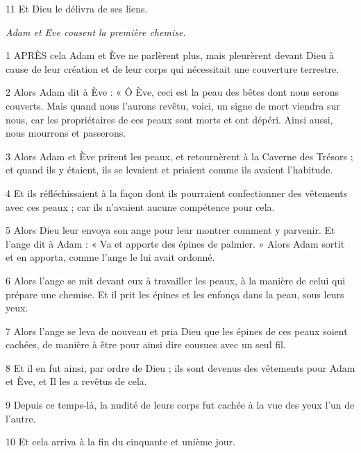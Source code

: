 \par 11 Et Dieu le délivra de ses liens.


\par \textit{Adam et Eve cousent la première chemise.}

\par 1 APRÈS cela Adam et Ève ne parlèrent plus, mais pleurèrent devant Dieu à cause de leur création et de leur corps qui nécessitait une couverture terrestre.

\par 2 Alors Adam dit à Ève : « Ô Ève, ceci est la peau des bêtes dont nous serons couverts. Mais quand nous l'aurons revêtu, voici, un signe de mort viendra sur nous, car les propriétaires de ces peaux sont morts et ont dépéri. Ainsi aussi, nous mourrons et passerons.

\par 3 Alors Adam et Ève prirent les peaux, et retournèrent à la Caverne des Trésors ; et quand ils y étaient, ils se levaient et priaient comme ils avaient l'habitude.

\par 4 Et ils réfléchissaient à la façon dont ils pourraient confectionner des vêtements avec ces peaux ; car ils n’avaient aucune compétence pour cela.

\par 5 Alors Dieu leur envoya son ange pour leur montrer comment y parvenir. Et l'ange dit à Adam : « Va et apporte des épines de palmier. » Alors Adam sortit et en apporta, comme l'ange le lui avait ordonné.

\par 6 Alors l'ange se mit devant eux à travailler les peaux, à la manière de celui qui prépare une chemise. Et il prit les épines et les enfonça dans la peau, sous leurs yeux.

\par 7 Alors l'ange se leva de nouveau et pria Dieu que les épines de ces peaux soient cachées, de manière à être pour ainsi dire cousues avec un seul fil.

\par 8 Et il en fut ainsi, par ordre de Dieu ; ils sont devenus des vêtements pour Adam et Ève, et Il les a revêtus de cela.

\par 9 Depuis ce temps-là, la nudité de leurs corps fut cachée à la vue des yeux l'un de l'autre.

\par 10 Et cela arriva à la fin du cinquante et unième jour.

